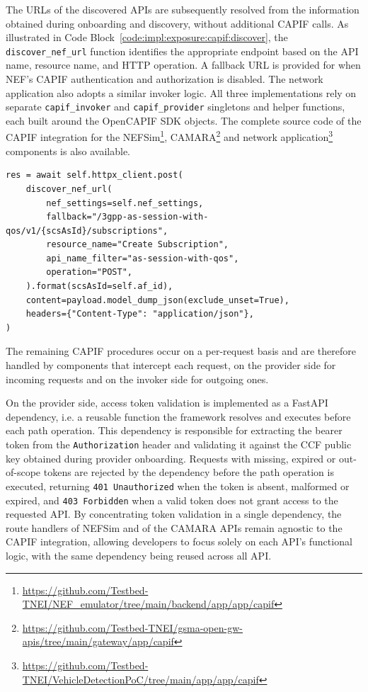 The \acsp{URL} of the discovered \acsp{API} are subsequently resolved from the information obtained during onboarding and discovery, without additional \acs{CAPIF} calls. As illustrated in Code Block~\ref{code:impl:exposure:capif:discover}, the \texttt{discover\_nef\_url} function identifies the appropriate endpoint based on the \acs{API} name, resource name, and \acs{HTTP} operation. A fallback \acs{URL} is provided for when \acs{NEF}'s \acs{CAPIF} authentication and authorization is disabled. The network application also adopts a similar invoker logic. All three implementations rely on separate \texttt{capif\_invoker} and \texttt{capif\_provider} singletons and helper functions, each built around the Open\acs{CAPIF} \acs{SDK} objects. The complete source code of the \acs{CAPIF} integration for the \acs{NEF}Sim\footnote{\url{https://github.com/Testbed-TNEI/NEF_emulator/tree/main/backend/app/app/capif}}, CAMARA\footnote{\url{https://github.com/Testbed-TNEI/gsma-open-gw-apis/tree/main/gateway/app/capif}} and network application\footnote{\url{https://github.com/Testbed-TNEI/VehicleDetectionPoC/tree/main/app/app/capif}} components is also available.


\begin{listing}[htbp]
\begin{verbatim}
res = await self.httpx_client.post(
    discover_nef_url(
        nef_settings=self.nef_settings,
        fallback="/3gpp-as-session-with-qos/v1/{scsAsId}/subscriptions",
        resource_name="Create Subscription",
        api_name_filter="as-session-with-qos",
        operation="POST",
    ).format(scsAsId=self.af_id),
    content=payload.model_dump_json(exclude_unset=True),
    headers={"Content-Type": "application/json"},
)
\end{verbatim}
\caption{CAMARA invocation of \acs{NEF} \acs{API} using \acs{CAPIF} discovery results}
\label{code:impl:exposure:capif:discover}
\end{listing}

The remaining \acs{CAPIF} procedures occur on a per-request basis and are therefore handled by components that intercept each request, on the provider side for incoming requests and on the invoker side for outgoing ones.

On the provider side, access token validation is implemented as a Fast\acs{API} dependency, i.e. a reusable function the framework resolves and executes before each path operation. This dependency is responsible for extracting the bearer token from the \texttt{Authorization} header and validating it against the \acs{CCF} public key obtained during provider onboarding. Requests with missing, expired or out-of-scope tokens are rejected by the dependency before the path operation is executed, returning \texttt{401 Unauthorized} when the token is absent, malformed or expired, and \texttt{403 Forbidden} when a valid token does not grant access to the requested \acs{API}. By concentrating token validation in a single dependency, the route handlers of \acs{NEF}Sim and of the CAMARA \acsp{API} remain agnostic to the \acs{CAPIF} integration, allowing developers to focus solely on each \acs{API}'s functional logic, with the same dependency being reused across all \acs{API}.

